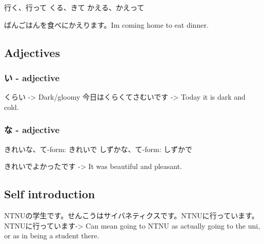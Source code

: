 行く、行って
くる、きて
かえる、かえって

ばんごはんを食べにかえります。Im coming home to eat dinner.

\subsection{Adjectives}
\subsubsection{い - adjective}
くらい -> Dark/gloomy
今日はくらくてさむいです -> Today it is dark and cold.

\subsubsection{な - adjective}
きれいな、て-form: きれいで
しずかな、て-form: しずかで

きれいでよかったです -> It was beautiful and pleasant.

\subsection{Self introduction}
NTNUの学生です。せんこうはサイバネティクスです。NTNUに行っています。
NTNUに行っています-> Can mean going to NTNU as actually going to the uni, or as in being a student there.





